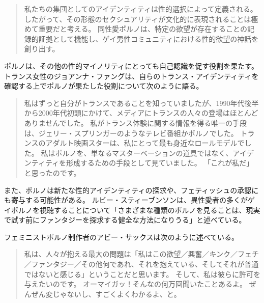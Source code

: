 \documentclass[paper=a4,book,openany]{jlreq}
\begin{document}
\begin{quote}
私たちの集団としてのアイデンティティは性的選択によって定義される。
したがって、その形態のセクシュアリティが文化的に表現されることは極めて重要だと考える。
同性愛ポルノは、特定の欲望が存在することの記録的証拠として機能し、ゲイ男性コミュニティにおける性的欲望の神話を創り出す。
\citep[p.204]{ellis13:_porn_again}
\end{quote}
ポルノは、その他の性的マイノリティにとっても自己認識を促す役割を果たす。
トランス女性のジョアンナ・ファングは、自らのトランス・アイデンティティを確認する上でポルノが果たした役割について次のように語る。
\begin{quote}

  私はずっと自分がトランスであることを知っていましたが、1990年代後半から2000年代初頭にかけて、メディアにトランスの人々の登場はほとんどありませんでした。
私がトランス体験に関する情報を得る唯一の手段は、ジェリー・スプリンガーのようなテレビ番組かポルノでした。
トランスのアダルト映画スターは、私にとって最も身近なロールモデルでした。
私はポルノを、単なるマスターベーションの道具ではなく、アイデンティティを形成するための手段として見ていました。
「これが私だ」と思ったのです。
\citep{white17:_how_trans_affec_sex_drive_porn_consum}
\end{quote}

また、ポルノは新たな性的アイデンティティの探求や、フェティッシュの承認にも寄与する可能性がある。
ルビー・スティーブンソンは、異性愛者の多くがゲイポルノを視聴することについて「さまざまな種類のポルノを見ることは、現実で試す前にファンタジーを探求する健全な方法になりうる」と述べている\citep{bloodworth18:_this_is_why_straig_men}。

フェミニストポルノ制作者のアビー・サックスは次のように述べている。

\begin{quote}
私は、人々が抱える最大の問題は「私はこの欲望／興奮／キンク／フェチ／ファンタジー／その他何であれ、それを抱えている、そしてそれが普通ではないと感じる」ということだと思います。
そして、私は彼らに許可を与えたいのです。
オーマイガッ！そんなの何万回聞いたことあるよ。
ぜんぜん変じゃないし、すごくよくわかるよ、と。
\citep{sachs12:_inter_femin_pornog}
\end{quote}
\end{document}
